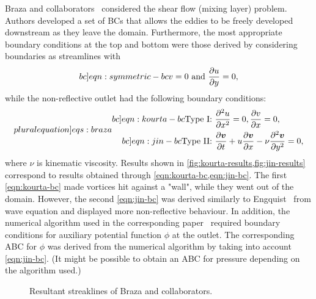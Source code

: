 \documentclass{article}
\begin{document}
Braza and collaborators~\cite{Jin:1993,Kourta:1987,Persillon:1998} considered the shear flow (mixing layer) problem. Authors developed a set of BCs that allows the eddies to be freely developed downstream as they leave the domain. Furthermore, the most appropriate boundary conditions at the top and bottom were those derived by considering boundaries as streamlines with
\begin{equation}\label[bc]{eqn:symmetric-bc}
	v=0\text{ and } \frac{\partial u}{\partial y}=0,
\end{equation}
while the non-reflective outlet had the following boundary conditions: 
\begin{subequations}
\label[pluralequation]{eqs:braza}
\begin{align}
\label[bc]{eqn:kourta-bc}
	\text{Type I: }&\frac{\partial ^2u}{\partial x^2}=0,\frac{\partial v}{\partial x	}=0,\\
\label[bc]{eqn:jin-bc}
	\text{Type II: }&\frac{\partial \boldsymbol{v}}{\partial t}+u\frac{\partial \boldsymbol{v}}{\partial x}-\nu \frac{\partial^2 \boldsymbol{v}}{\partial y^2}=0,
\end{align}
\end{subequations}
where $\nu$ is kinematic viscosity. 
Results shown in \cref{fig:kourta-results,fig:jin-results} correspond to results obtained through \cref{eqn:kourta-bc,eqn:jin-bc}.
	The first \cref{eqn:kourta-bc} made vortices hit against a "wall", while they went out of the domain. 
	However, the second \cref{eqn:jin-bc} was derived similarly to Engquist~\cite{Engquist:1977} from wave equation and displayed more non-reflective behaviour. 
	In addition, the numerical algorithm used in the corresponding paper~\cite{Jin:1993} required boundary conditions for auxiliary potential function $\phi$ at the outlet. 
	The corresponding ABC for $\phi$ was derived from the numerical algorithm by taking into account \cref{eqn:jin-bc}. 
	(It might be possible to obtain an ABC for pressure depending on the algorithm used.)
\begin{figure}
\centering
   \quad
\caption{\small Resultant streaklines of Braza and collaborators.}
\end{figure}
\end{document}
